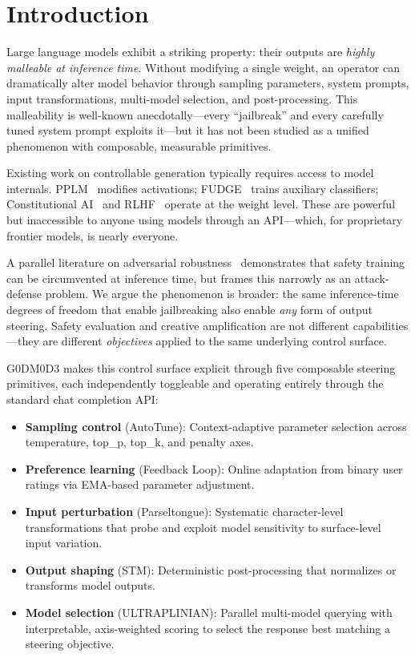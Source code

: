 \documentclass[11pt]{article}
\begin{document}
\section{Introduction}

Large language models exhibit a striking property: their outputs are \emph{highly malleable at inference time}. Without modifying a single weight, an operator can dramatically alter model behavior through sampling parameters, system prompts, input transformations, multi-model selection, and post-processing. This malleability is well-known anecdotally---every ``jailbreak'' and every carefully tuned system prompt exploits it---but it has not been studied as a unified phenomenon with composable, measurable primitives.

Existing work on controllable generation typically requires access to model internals. PPLM~\cite{dathathri2020plug} modifies activations; FUDGE~\cite{yang2021fudge} trains auxiliary classifiers; Constitutional AI~\cite{bai2022constitutional} and RLHF~\cite{ouyang2022training} operate at the weight level. These are powerful but inaccessible to anyone using models through an API---which, for proprietary frontier models, is nearly everyone.

A parallel literature on adversarial robustness~\cite{zou2023universal,wei2023jailbroken,chao2023jailbreaking} demonstrates that safety training can be circumvented at inference time, but frames this narrowly as an attack-defense problem. We argue the phenomenon is broader: the same inference-time degrees of freedom that enable jailbreaking also enable \emph{any} form of output steering. Safety evaluation and creative amplification are not different capabilities---they are different \emph{objectives} applied to the same underlying control surface.

\textsc{G0DM0D3} makes this control surface explicit through five composable steering primitives, each independently toggleable and operating entirely through the standard chat completion API:

\begin{itemize}
    \item \textbf{Sampling control} (AutoTune): Context-adaptive parameter selection across temperature, top\_p, top\_k, and penalty axes.
    \item \textbf{Preference learning} (Feedback Loop): Online adaptation from binary user ratings via EMA-based parameter adjustment.
    \item \textbf{Input perturbation} (Parseltongue): Systematic character-level transformations that probe and exploit model sensitivity to surface-level input variation.
    \item \textbf{Output shaping} (STM): Deterministic post-processing that normalizes or transforms model outputs.
    \item \textbf{Model selection} (ULTRAPLINIAN): Parallel multi-model querying with interpretable, axis-weighted scoring to select the response best matching a steering objective.
\end{itemize}
\end{document}
